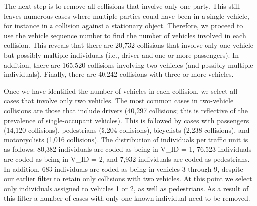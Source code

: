 \documentclass[]{elsarticle} %
\begin{document}
The next step is to remove all collisions that involve only one party.
This still leaves numerous cases where multiple parties could have been
in a single vehicle, for instance in a collision against a stationary
object. Therefore, we proceed to use the vehicle sequence number to find
the number of vehicles involved in each collision. This reveals that
there are 20,732 collisions that involve only one vehicle but possibly
multiple individuals (i.e., driver and one or more passengers). In
addition, there are 165,520 collisions involving two vehicles (and
possibly multiple individuals). Finally, there are 40,242 collisions
with three or more vehicles.

Once we have identified the number of vehicles in each collision, we
select all cases that involve only two vehicles. The most common cases
in two-vehicle collisions are those that include drivers (40,297
collisions; this is reflective of the prevalence of single-occupant
vehicles). This is followed by cases with passengers (14,120
collisions), pedestrians (5,204 collisions), bicyclists (2,238
collisions), and motorcyclists (1,016 collisions). The distribution of
individuals per traffic unit is as follows: 80,382 individuals are coded
as being in V\_ID = 1, 76,523 individuals are coded as being in V\_ID =
2, and 7,932 individuals are coded as pedestrians. In addition, 683
individuals are coded as being in vehicles 3 through 9, despite our
earlier filter to retain only collisions with two vehicles. At this
point we select only individuals assigned to vehicles 1 or 2, as well as
pedestrians. As a result of this filter a number of cases with only one
known individual need to be removed.
\end{document}
